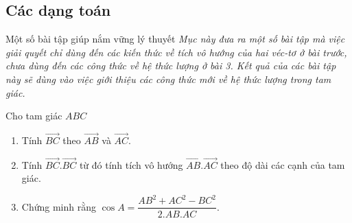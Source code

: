 \subsection{Các dạng toán}
\begin{dang}{Một số bài tập giúp nắm vững lý thuyết}
\textit{Mục này đưa ra một số bài tập mà việc giải quyết chỉ dùng đến các kiến thức về tích vô hướng của hai véc-tơ ở bài trước, chưa dùng đến các công thức về hệ thức lượng ở bài 3. Kết quả của các bài tập này sẽ dùng vào việc giới thiệu các công thức mới về hệ thức lượng trong tam giác.}
\end{dang}
\begin{vd}%
	Cho tam giác $ABC$
	\begin{enumerate}
		\item Tính $\vec{BC}$ theo $\vec{AB}$ và $\vec{AC}$.
		\item Tính $\vec{BC}.\vec{BC}$ từ đó tính tích vô hướng $\vec{AB}.\vec{AC}$ theo độ dài các cạnh của tam giác.
		\item Chứng minh rằng $\cos A=\dfrac{AB^2+AC^2-BC^2}{2.AB.AC}.$
	\end{enumerate}
\end{vd}

